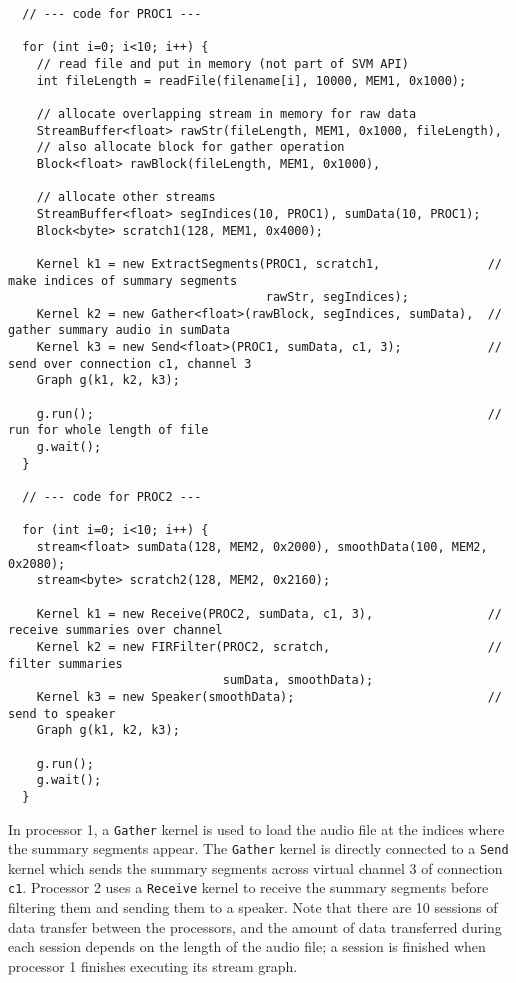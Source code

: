 {\small
\begin{verbatim}
  // --- code for PROC1 ---

  for (int i=0; i<10; i++) {
    // read file and put in memory (not part of SVM API)
    int fileLength = readFile(filename[i], 10000, MEM1, 0x1000);

    // allocate overlapping stream in memory for raw data
    StreamBuffer<float> rawStr(fileLength, MEM1, 0x1000, fileLength), 
    // also allocate block for gather operation
    Block<float> rawBlock(fileLength, MEM1, 0x1000), 

    // allocate other streams
    StreamBuffer<float> segIndices(10, PROC1), sumData(10, PROC1);
    Block<byte> scratch1(128, MEM1, 0x4000);

    Kernel k1 = new ExtractSegments(PROC1, scratch1,               // make indices of summary segments
                                    rawStr, segIndices);
    Kernel k2 = new Gather<float>(rawBlock, segIndices, sumData),  // gather summary audio in sumData
    Kernel k3 = new Send<float>(PROC1, sumData, c1, 3);            // send over connection c1, channel 3
    Graph g(k1, k2, k3);
            
    g.run();                                                       // run for whole length of file
    g.wait();
  }

  // --- code for PROC2 ---

  for (int i=0; i<10; i++) {
    stream<float> sumData(128, MEM2, 0x2000), smoothData(100, MEM2, 0x2080);
    stream<byte> scratch2(128, MEM2, 0x2160);

    Kernel k1 = new Receive(PROC2, sumData, c1, 3),                // receive summaries over channel
    Kernel k2 = new FIRFilter(PROC2, scratch,                      // filter summaries
                              sumData, smoothData);
    Kernel k3 = new Speaker(smoothData);                           // send to speaker
    Graph g(k1, k2, k3);

    g.run();
    g.wait();
  }   
\end{verbatim}}
In processor 1, a {\tt Gather} kernel is used to load the audio file
at the indices where the summary segments appear.  The {\tt Gather}
kernel is directly connected to a {\tt Send} kernel which sends the
summary segments across virtual channel 3 of connection {\tt c1}.
Processor 2 uses a {\tt Receive} kernel to receive the summary
segments before filtering them and sending them to a speaker.  Note
that there are 10 sessions of data transfer between the processors,
and the amount of data transferred during each session depends on the
length of the audio file; a session is finished when processor 1
finishes executing its stream graph.

